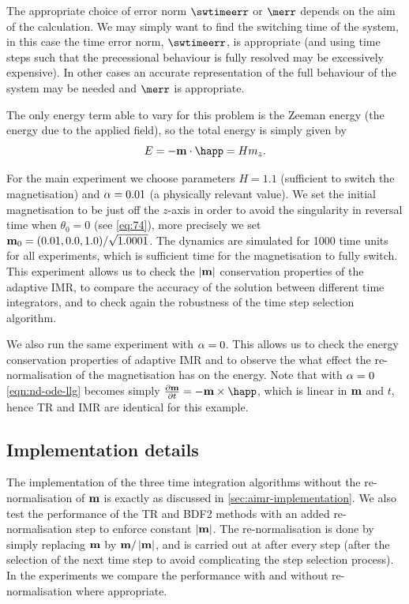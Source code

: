 The appropriate choice of error norm $\swtimeerr$ or $\merr$ depends on the aim of the calculation.
We may simply want to find the switching time of the system, in this case the time error norm, $\swtimeerr$, is appropriate (and using time steps such that the precessional behaviour is fully resolved may be excessively expensive).
In other cases an accurate representation of the full behaviour of the system may be needed and $\merr$ is appropriate.

The only energy term able to vary for this problem is the Zeeman energy (the energy due to the
applied field), so the total energy is simply given by
\begin{equation}
  E = - \mv \cdot \happ = H m_z.
\end{equation}

For the main experiment we choose parameters $H = 1.1$ (sufficient to switch the magnetisation) and $\alpha = 0.01$ (a physically relevant value).
We set the initial magnetisation to be just off the $z$-axis in order to avoid the singularity in reversal time when $\theta_0 = 0$ (see \cref{eq:74}), more precisely we set $\boldsymbol{\mathrm{m}}_0 = (0.01, 0.0, 1.0)/\sqrt{1.0001}$.
The dynamics are simulated for 1000 time units for all experiments, which is sufficient time for the magnetisation to fully switch.
This experiment allows us to check the $\left|{\boldsymbol{\mathrm{m}}} \right|$ conservation properties of the adaptive IMR, to compare the accuracy of the solution between different time integrators, and to check again the robustness of the time step selection algorithm.

We also run the same experiment with $\alpha = 0$.
This allows us to check the energy conservation properties of adaptive IMR and to observe the what effect the re-normalisation of the magnetisation has on the energy.
Note that with $\alpha = 0$ \cref{eqn:nd-ode-llg} becomes simply $\dmdt = - \mv \times \happ$, which is linear in $\boldsymbol{\mathrm{m}}$ and $t$, hence TR and IMR are identical for this example.



\subsection{Implementation details}

The implementation of the three time integration algorithms without the re-normalisation of $\boldsymbol{\mathrm{m}}$ is exactly as discussed in \cref{sec:aimr-implementation}.
We also test the performance of the TR and BDF2 methods with an added re-normalisation step to enforce constant $\left|{\boldsymbol{\mathrm{m}}} \right|$.
The re-normalisation is done by simply replacing $\boldsymbol{\mathrm{m}}$ by $\boldsymbol{\mathrm{m}}/\left|{\boldsymbol{\mathrm{m}}} \right|$, and is carried out at after every step (after the selection of the next time step to avoid complicating the step selection process).
In the experiments we compare the performance with and without re-normalisation where appropriate.

